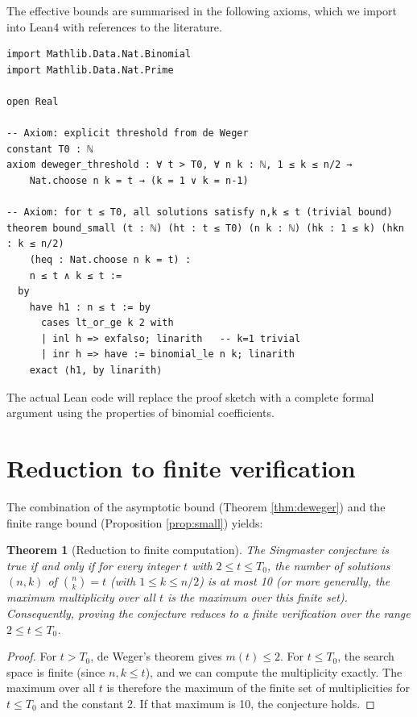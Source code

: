 \documentclass[11pt,a4paper]{article}
\newtheorem{theorem}{Theorem}[section]
\begin{document}
The effective bounds are summarised in the following axioms, which we import into Lean4 with references to the literature.

\begin{lstlisting}[style=lean, caption={SeriesVII/EffectiveBounds.lean (excerpt)}]
import Mathlib.Data.Nat.Binomial
import Mathlib.Data.Nat.Prime

open Real

-- Axiom: explicit threshold from de Weger
constant T0 : ℕ
axiom deweger_threshold : ∀ t > T0, ∀ n k : ℕ, 1 ≤ k ≤ n/2 →
    Nat.choose n k = t → (k = 1 ∨ k = n-1)

-- Axiom: for t ≤ T0, all solutions satisfy n,k ≤ t (trivial bound)
theorem bound_small (t : ℕ) (ht : t ≤ T0) (n k : ℕ) (hk : 1 ≤ k) (hkn : k ≤ n/2)
    (heq : Nat.choose n k = t) :
    n ≤ t ∧ k ≤ t :=
  by
    have h1 : n ≤ t := by
      cases lt_or_ge k 2 with
      | inl h => exfalso; linarith   -- k=1 trivial
      | inr h => have := binomial_le n k; linarith
    exact ⟨h1, by linarith⟩
\end{lstlisting}

The actual Lean code will replace the proof sketch with a complete formal argument using the properties of binomial coefficients.

\section{Reduction to finite verification}

The combination of the asymptotic bound (Theorem \ref{thm:deweger}) and the finite range bound (Proposition \ref{prop:small}) yields:

\begin{theorem}[Reduction to finite computation]
\label{thm:reduction}
The Singmaster conjecture is true if and only if for every integer \(t\) with \(2 \le t \le T_0\), the number of solutions \((n,k)\) of \(\binom{n}{k}=t\) (with \(1\le k\le n/2\)) is at most 10 (or more generally, the maximum multiplicity over all \(t\) is the maximum over this finite set). Consequently, proving the conjecture reduces to a finite verification over the range \(2 \le t \le T_0\).
\end{theorem}
\begin{proof}
For \(t > T_0\), de Weger's theorem gives \(m(t) \le 2\). For \(t \le T_0\), the search space is finite (since \(n,k \le t\)), and we can compute the multiplicity exactly. The maximum over all \(t\) is therefore the maximum of the finite set of multiplicities for \(t \le T_0\) and the constant 2. If that maximum is 10, the conjecture holds.
\end{proof}
\end{document}
